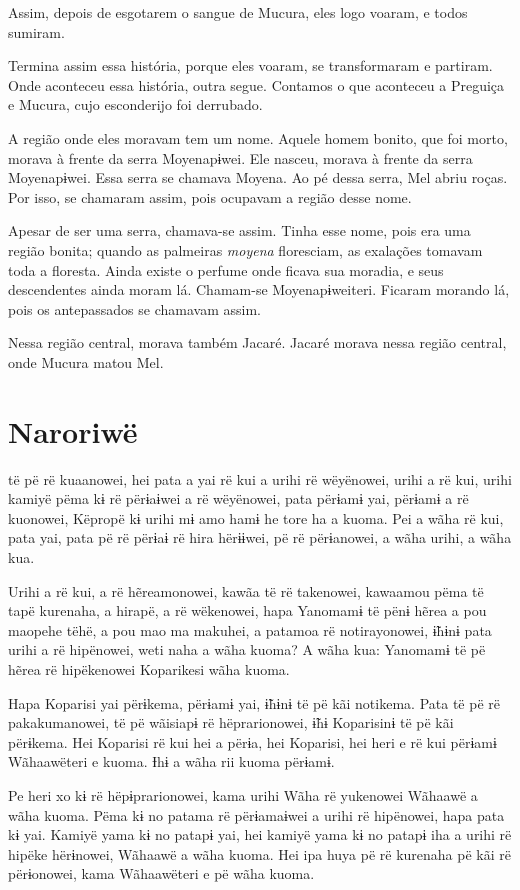 Assim, depois de esgotarem o sangue de Mucura, eles logo voaram, e todos
sumiram. 

Termina assim essa história, porque eles voaram, se transformaram e
partiram. Onde aconteceu essa história, outra segue. Contamos o que
aconteceu a Preguiça e Mucura, cujo esconderijo foi derrubado.

A região onde eles moravam tem um nome. Aquele homem bonito, que foi
morto, morava à frente da serra Moyenapɨwei. Ele nasceu, morava à frente
da serra Moyenapɨwei.  Essa serra se chamava Moyena.
Ao pé dessa serra, Mel abriu roças. Por isso, se chamaram assim, pois
ocupavam a região desse nome. 

Apesar de ser uma serra, chamava-se assim. Tinha esse nome, pois era uma
região bonita; quando as palmeiras \textit{moyena} floresciam, as exalações
tomavam toda a floresta. Ainda existe o perfume onde ficava sua moradia,
e seus descendentes ainda moram lá. Chamam-se Moyenapɨweiteri. Ficaram
morando lá, pois os antepassados se chamavam assim. 

Nessa região central, morava também Jacaré. Jacaré morava nessa região
central, onde Mucura matou Mel.

\chapter{Naroriwë}

 të pë rë kuaanowei, hei pata a yai rë kui a urihi rë wëyënowei,
urihi a rë kui, urihi kamiyë pëma kɨ rë përɨaɨwei a rë wëyënowei, pata
përɨamɨ yai, përɨamɨ a rë kuonowei, Këpropë kɨ urihi mɨ amo hamɨ he tore
ha a kuoma. Pei a wãha rë kui, pata yai, pata pë rë përɨaɨ rë hira
hërɨɨwei, pë rë përɨanowei, a wãha urihi, a wãha kua.

Urihi a rë kui, a rë hẽreamonowei, kawãa të rë takenowei, kawaamou pëma
të tapë kurenaha, a hirapë, a rë wëkenowei, hapa Yanomamɨ të pënɨ hẽrea
a pou maopehe tëhë, a pou mao ma makuhei, a patamoa rë notirayonowei,
ɨ̃hɨnɨ pata urihi a rë hipënowei, weti naha a wãha kuoma? A wãha kua:
Yanomamɨ të pë hẽrea rë hipëkenowei Koparikesi wãha kuoma. 

Hapa Koparisi yai përɨkema, përɨamɨ yai, ɨ̃hɨnɨ të pë kãi notikema. Pata
të pë rë pakakumanowei, të pë wãisiapɨ rë hëprarionowei, ɨ̃hɨ Koparisinɨ
të pë kãi përɨkema. Hei Koparisi rë kui hei a përɨa, hei Koparisi, hei
heri e rë kui përɨamɨ Wãhaawëteri e kuoma. Ɨhɨ a wãha rii kuoma
përɨamɨ. 

Pe heri xo kɨ rë hëpɨprarionowei, kama urihi Wãha rë yukenowei Wãhaawë a
wãha kuoma. Pëma kɨ no patama rë përɨamaɨwei a urihi rë hipënowei, hapa
pata kɨ yai. Kamiyë yama kɨ no patapɨ yai, hei kamiyë yama kɨ no patapɨ
iha a urihi rë hipëke hërɨnowei, Wãhaawë a wãha kuoma. Hei ipa huya pë rë
kurenaha pë kãi rë përɨonowei, kama Wãhaawëteri e pë wãha kuoma.

